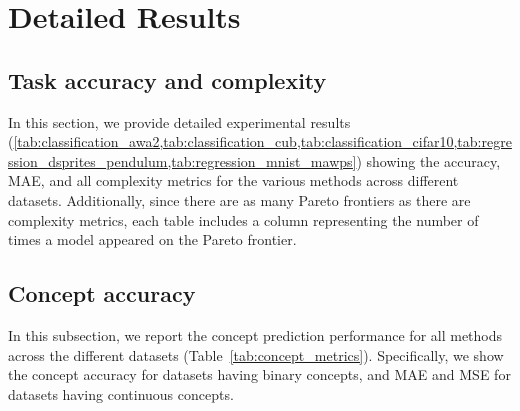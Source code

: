 \documentclass{article}
\theoremstyle{plain}
\theoremstyle{definition}
\theoremstyle{remark}
\begin{document}



\section{Detailed Results}
\label{app:detailed_results}

\subsection{Task accuracy and complexity}
In this section, we provide detailed experimental results (\cref{tab:classification_awa2,tab:classification_cub,tab:classification_cifar10,tab:regression_dsprites_pendulum,tab:regression_mnist_mawps}) showing the accuracy, MAE, and all complexity metrics for the various methods across different datasets. Additionally, since there are as many Pareto frontiers as there are complexity metrics, each table includes a column representing the number of times a model appeared on the Pareto frontier.





\subsection{Concept accuracy}

In this subsection, we report the concept prediction performance for all methods across the different datasets (Table~\ref{tab:concept_metrics}). Specifically, we show the concept accuracy for datasets having binary concepts, and MAE and MSE for datasets having continuous concepts.


\end{document}
